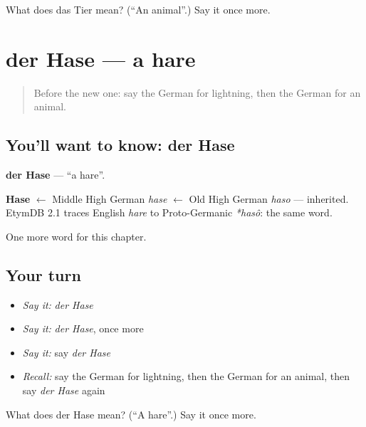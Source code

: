 \begin{tcolorbox}[breakable,colback=teal!4,colframe=teal!35!black,title={Before you move on}]
What does das Tier mean? (\textquotedblleft{}An animal\textquotedblright{}.) Say it once more.
\end{tcolorbox}
\section[der Hase]{der Hase — a hare}

\label{lesson:GE-C198-hase}



\begin{quote}
Before the new one: say the German for lightning, then the German for an animal.
\end{quote}

\subsection*{You'll want to know: der Hase}
\textbf{der Hase} — \textquotedblleft{}a hare\textquotedblright{}.

\begin{cousinweb}
\textbf{Hase} $\leftarrow$ Middle High German \emph{hase} $\leftarrow$ Old High German \emph{haso} — inherited. EtymDB 2.1 traces English \emph{hare} to Proto-Germanic \emph{*hasô}: the same word.
\end{cousinweb}

\begin{grammarlens}[title={What you've built}]
One more word for this chapter.
\end{grammarlens}

\subsection*{Your turn}
\begin{itemize}
\raggedright
  \item \emph{Say it:} \emph{der Hase}
  \item \emph{Say it:} \emph{der Hase}, once more
  \item \emph{Say it:} say \emph{der Hase}
  \item \emph{Recall:} say the German for lightning, then the German for an animal, then say \emph{der Hase} again
\end{itemize}

\begin{tcolorbox}[breakable,colback=teal!4,colframe=teal!35!black,title={Before you move on}]
What does der Hase mean? (\textquotedblleft{}A hare\textquotedblright{}.) Say it once more.
\end{tcolorbox}

